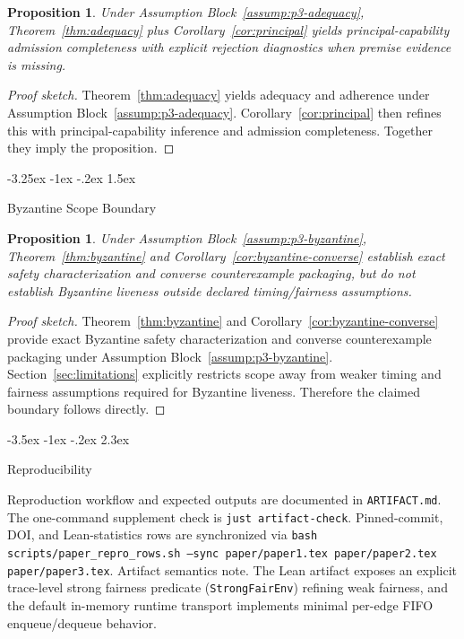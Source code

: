 \documentclass[a4paper,10pt,twocolumn,english]{article}
\makeatletter
\renewcommand{\section}{\@startsection{section}{1}{\z@}%
  {-3.5ex \@plus -1ex \@minus -.2ex}%
  {2.3ex}%
  {\raggedright\normalfont\large\bfseries}}
\renewcommand{\subsection}{\@startsection{subsection}{2}{\z@}%
  {-3.25ex \@plus -1ex \@minus -.2ex}%
  {1.5ex}%
  {\raggedright\normalfont\normalsize\bfseries}}
\numberwithin{equation}{section}
\theoremstyle{paperdef}
\theoremstyle{paperplain}
\newtheorem{proposition}[definition]{Proposition}
\theoremstyle{paperdef}
\theoremstyle{paperremark}
\theoremstyle{paperdef}
\makeatother
\begin{document}
\begin{proposition}
	Under Assumption Block~\ref{assump:p3-adequacy}, Theorem~\ref{thm:adequacy} plus Corollary~\ref{cor:principal} yields principal-capability admission completeness with explicit rejection diagnostics when premise evidence is missing.
\end{proposition}

\begin{proof}[Proof sketch]
	Theorem~\ref{thm:adequacy} yields adequacy and adherence under Assumption Block~\ref{assump:p3-adequacy}. Corollary~\ref{cor:principal} then refines this with principal-capability inference and admission completeness. Together they imply the proposition.
\end{proof}

\subsection{Byzantine Scope Boundary}

\begin{proposition}
	Under Assumption Block~\ref{assump:p3-byzantine}, Theorem~\ref{thm:byzantine} and Corollary~\ref{cor:byzantine-converse} establish exact safety characterization and converse counterexample packaging, but do not establish Byzantine liveness outside declared timing/fairness assumptions.
\end{proposition}

\begin{proof}[Proof sketch]
	Theorem~\ref{thm:byzantine} and Corollary~\ref{cor:byzantine-converse} provide exact Byzantine safety characterization and converse counterexample packaging under Assumption Block~\ref{assump:p3-byzantine}. Section~\ref{sec:limitations} explicitly restricts scope away from weaker timing and fairness assumptions required for Byzantine liveness. Therefore the claimed boundary follows directly.
\end{proof}

\section{Reproducibility}
\label{app:reproducibility}

Reproduction workflow and expected outputs are documented in
\texttt{ARTIFACT.md}. The one-command supplement check is
\texttt{just artifact-check}. Pinned-commit, DOI, and Lean-statistics rows are
synchronized via
\texttt{bash scripts/paper\_repro\_rows.sh --sync paper/paper1.tex paper/paper2.tex paper/paper3.tex}.
Artifact semantics note. The Lean artifact exposes an explicit trace-level
strong fairness predicate (\texttt{StrongFairEnv}) refining weak fairness, and
the default in-memory runtime transport implements minimal per-edge FIFO
enqueue/dequeue behavior.
\end{document}
